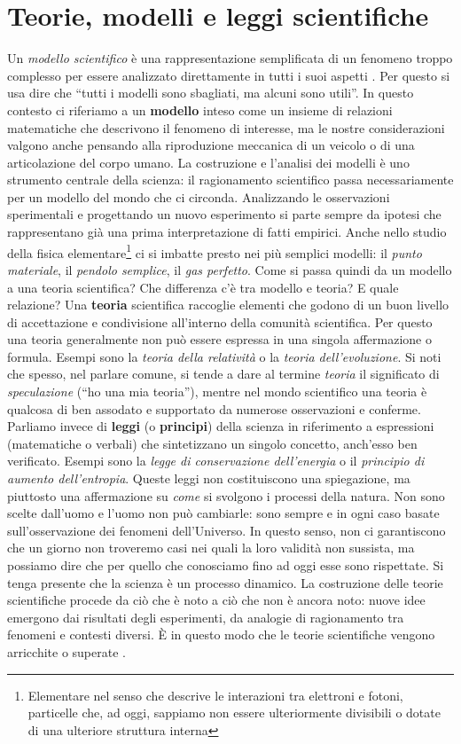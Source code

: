 \section*{Teorie, modelli e leggi scientifiche}
Un \emph{modello scientifico} è una rappresentazione semplificata di un fenomeno
troppo complesso per essere analizzato direttamente in tutti i suoi aspetti \cite{bndl}. Per questo 
si usa dire che ``tutti i modelli sono sbagliati, ma alcuni sono utili''. 
In questo contesto ci riferiamo a un \textbf{modello} inteso come un insieme di relazioni 
matematiche che descrivono il fenomeno di interesse, ma le nostre considerazioni valgono anche
pensando alla riproduzione meccanica di un veicolo o di una articolazione 
del corpo umano.
La costruzione e l'analisi dei modelli è uno strumento centrale della scienza: il ragionamento
scientifico passa necessariamente per un modello del mondo che ci circonda. Analizzando
le osservazioni sperimentali e progettando un nuovo esperimento si parte sempre da ipotesi 
che rappresentano già una prima interpretazione di fatti empirici.
Anche nello studio della fisica elementare\footnote{Elementare nel senso che descrive le interazioni
tra elettroni e fotoni, particelle che, ad oggi, sappiamo non essere ulteriormente divisibili o dotate
di una ulteriore struttura interna} ci si imbatte presto nei più semplici modelli:
il \emph{punto materiale}, il \emph{pendolo semplice}, il \emph{gas perfetto}. Come si passa quindi da un modello
a una teoria scientifica? Che differenza c'è tra modello e teoria? E quale relazione?
Una \textbf{teoria} scientifica raccoglie elementi che godono di un buon livello di accettazione e 
condivisione all'interno della comunità scientifica. Per questo una teoria generalmente non
può essere espressa in una singola affermazione o formula. Esempi sono la \emph{teoria della relatività}
o la \emph{teoria dell'evoluzione}.
Si noti che spesso, nel parlare comune, si tende a dare al termine \emph{teoria} il significato
di \emph{speculazione} (``ho una mia teoria''), mentre nel mondo scientifico una teoria è qualcosa
di ben assodato e supportato da numerose osservazioni e conferme.
Parliamo invece di \textbf{leggi} (o \textbf{principi}) della scienza in riferimento a 
espressioni (matematiche o verbali) che sintetizzano un singolo concetto, anch'esso ben verificato.
Esempi sono la \emph{legge di conservazione dell'energia} o il \emph{principio di aumento dell'entropia}.
Queste leggi non costituiscono una spiegazione, ma piuttosto una affermazione su \textsl{come} si
svolgono i processi della natura. Non sono scelte dall'uomo e l'uomo non può cambiarle: sono
sempre e in ogni caso basate sull'osservazione dei fenomeni dell'Universo. In questo senso,
non ci garantiscono che un giorno non troveremo casi nei quali la loro validità non sussista,
ma possiamo dire che per quello che conosciamo fino ad oggi esse sono rispettate.
Si tenga presente che la scienza è un processo dinamico. La costruzione delle teorie scientifiche
procede da ciò che è noto a ciò che non è ancora noto:
nuove idee emergono dai risultati degli esperimenti, da analogie di ragionamento tra
fenomeni e contesti diversi. È in questo modo che le teorie scientifiche vengono arricchite o 
superate \cite{hrtm}.


